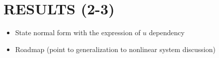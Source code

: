 
\section{RESULTS (2-3)}


\begin{itemize}
\color{grey1} 
\item State normal form with the expression of $u$ dependency
\item Roadmap (point to generalization to nonlinear system discussion)
\end{itemize}







